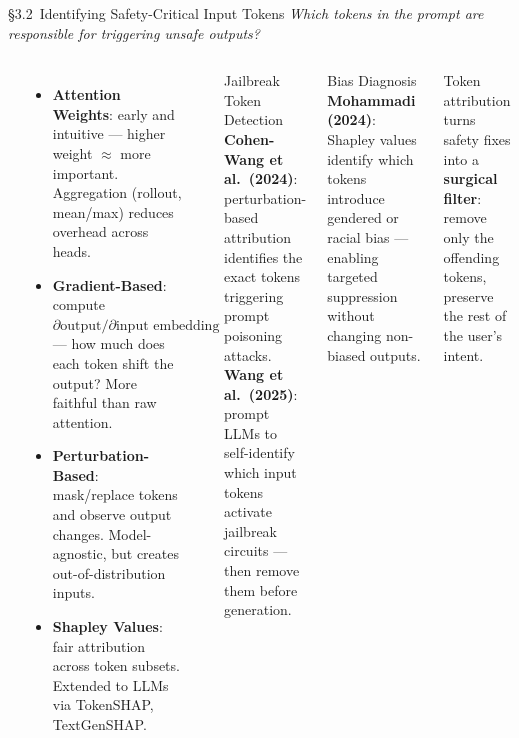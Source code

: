 \begin{frame}{\S3.2\ Identifying Safety-Critical Input Tokens}
  {\footnotesize\itshape Which tokens in the prompt are responsible for triggering unsafe outputs?}
  \vspace{0.3em}
  \begin{columns}[T]
    {\small\bfseries{}}
    \begin{itemize}\scriptsize\setlength\itemsep{4pt}
      \item \textbf{Attention Weights}: early and intuitive --- higher weight $\approx$ more important. Aggregation (rollout, mean/max) reduces overhead across heads. 
      \item \textbf{Gradient-Based}: compute $\partial \text{output}/\partial \text{input embedding}$ --- how much does each token shift the output? More faithful than raw attention.
      \item \textbf{Perturbation-Based}: mask/replace tokens and observe output changes. Model-agnostic, but creates out-of-distribution inputs.
      \item \textbf{Shapley Values}: fair attribution across token subsets. Extended to LLMs via TokenSHAP, TextGenSHAP.
    \end{itemize}

    {\small\bfseries{}}
    \begin{ucrcard}[UCRnavy]{Jailbreak Token Detection}
      \scriptsize
      \textbf{Cohen-Wang et al.\ (2024)}: perturbation-based attribution identifies the exact tokens triggering prompt poisoning attacks.\\[3pt]
      \textbf{Wang et al.\ (2025)}: prompt LLMs to self-identify which input tokens activate jailbreak circuits --- then remove them before generation.
    \end{ucrcard}
    \vspace{0.3em}
    \begin{ucrcard}[UCRnavy]{Bias Diagnosis}
      \scriptsize
      \textbf{Mohammadi (2024)}: Shapley values identify which tokens introduce gendered or racial bias --- enabling targeted suppression without changing non-biased outputs.
    \end{ucrcard}
    \vspace{0.3em}
    \begin{ucrdark}[UCRnavy]
      \centering\scriptsize
      Token attribution turns safety fixes into a \textbf{surgical filter}: remove only the offending tokens, preserve the rest of the user's intent.
    \end{ucrdark}
  \end{columns}
\end{frame}


